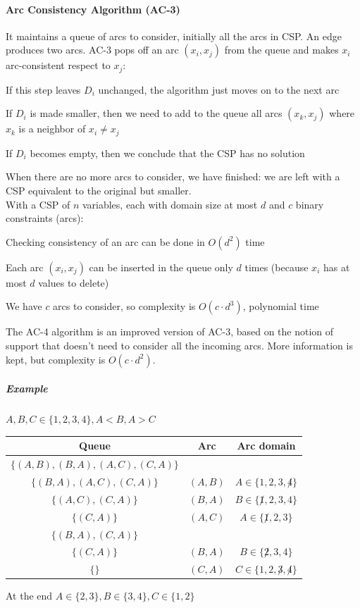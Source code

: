 \documentclass[10pt]{report}
\begin{document}
\paragraph{Arc Consistency Algorithm (AC-3)} It maintains a queue of arcs to consider, initially all the arcs in CSP. An edge produces two arcs. AC-3 pops off an arc $(x_i, x_j)$ from the queue and makes $x_i$ arc-consistent respect to $x_j$: \begin{list}{}{}
	\item If this step leaves $D_i$ unchanged, the algorithm just moves on to the next arc
	\item If $D_i$ is made smaller, then we need to add to the queue all arcs $(x_k, x_j)$ where $x_k$ is a neighbor of $x_i \neq x_j$
	\item If $D_i$ becomes empty, then we conclude that the CSP has no solution
\end{list}
When there are no more arcs to consider, we have finished: we are left with a CSP equivalent to the original but smaller.\\
With a CSP of $n$ variables, each with domain size at most $d$ and $c$ binary constraints (arcs):
\begin{list}{}{}
	\item Checking consistency of an arc can be done in $O(d^2)$ time
	\item Each arc $(x_i, x_j)$ can be inserted in the queue only $d$ times (because $x_i$ has at most $d$ values to delete)
	\item We have $c$ arcs to consider, so complexity is $O(c\cdot d^3)$, polynomial time
\end{list}
The AC-4 algorithm is an improved version of AC-3, based on the notion of support that doesn't need to consider all the incoming arcs. More information is kept, but complexity is $O(c\cdot d^2)$.
\subparagraph{Example} $A, B, C \in \{1,2,3,4\}, A < B, A > C$\\
\begin{center}
\begin{tabular}{c c c}
	Queue & Arc & Arc domain\\
	\hline
	$\{(A,B), (B, A), (A, C), (C, A)\}$ & & \\
	$\{(B, A), (A, C), (C, A)\}$ & $(A,B)$ & $A \in \{1,2,3,\not 4\}$ \\
	$\{(A,C), (C, A)\}$ & $(B, A)$ & $B \in \{\not 1, 2, 3, 4\}$\\
	$\{(C, A)\}$ & $(A, C)$ & $A \in \{\not 1, 2, 3\}$\\
	$\{(B,A), (C, A)\}$ & & \\
	$\{(C, A)\}$ & $(B, A)$ & $B \in \{\not 2, 3, 4\}$\\
	$\{\}$ & $(C, A)$ & $C \in \{1, 2, \not 3,\not 4\}$\\
\end{tabular}
\end{center}
At the end $A\in\{2,3\}, B\in\{3,4\}, C\in\{1,2\}$
\end{document}
